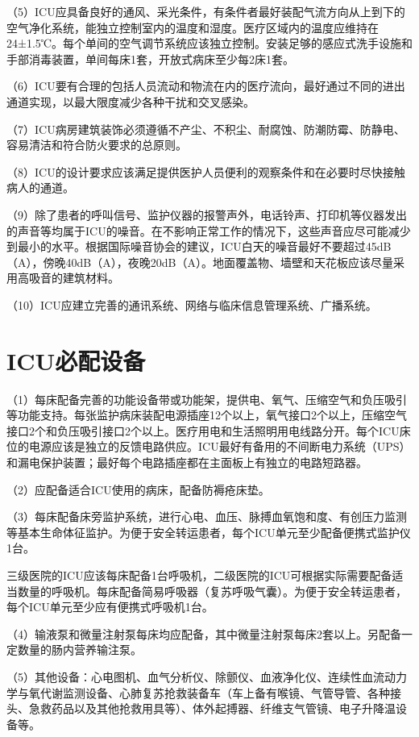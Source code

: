 （5）ICU应具备良好的通风、采光条件，有条件者最好装配气流方向从上到下的空气净化系统，能独立控制室内的温度和湿度。医疗区域内的温度应维持在24±1.5℃。每个单间的空气调节系统应该独立控制。安装足够的感应式洗手设施和手部消毒装置，单间每床1套，开放式病床至少每2床1套。

（6）ICU要有合理的包括人员流动和物流在内的医疗流向，最好通过不同的进出通道实现，以最大限度减少各种干扰和交叉感染。

（7）ICU病房建筑装饰必须遵循不产尘、不积尘、耐腐蚀、防潮防霉、防静电、容易清洁和符合防火要求的总原则。

（8）ICU的设计要求应该满足提供医护人员便利的观察条件和在必要时尽快接触病人的通道。

（9）除了患者的呼叫信号、监护仪器的报警声外，电话铃声、打印机等仪器发出的声音等均属于ICU的噪音。在不影响正常工作的情况下，这些声音应尽可能减少到最小的水平。根据国际噪音协会的建议，ICU白天的噪音最好不要超过45dB（A），傍晚40dB（A），夜晚20dB（A）。地面覆盖物、墙壁和天花板应该尽量采用高吸音的建筑材料。

（10）ICU应建立完善的通讯系统、网络与临床信息管理系统、广播系统。

\section{ICU必配设备}

（1）每床配备完善的功能设备带或功能架，提供电、氧气、压缩空气和负压吸引等功能支持。每张监护病床装配电源插座12个以上，氧气接口2个以上，压缩空气接口2个和负压吸引接口2个以上。医疗用电和生活照明用电线路分开。每个ICU床位的电源应该是独立的反馈电路供应。ICU最好有备用的不间断电力系统（UPS）和漏电保护装置；最好每个电路插座都在主面板上有独立的电路短路器。

（2）应配备适合ICU使用的病床，配备防褥疮床垫。

（3）每床配备床旁监护系统，进行心电、血压、脉搏血氧饱和度、有创压力监测等基本生命体征监护。为便于安全转运患者，每个ICU单元至少配备便携式监护仪1台。

三级医院的ICU应该每床配备1台呼吸机，二级医院的ICU可根据实际需要配备适当数量的呼吸机。每床配备简易呼吸器（复苏呼吸气囊）。为便于安全转运患者，每个ICU单元至少应有便携式呼吸机1台。

（4）输液泵和微量注射泵每床均应配备，其中微量注射泵每床2套以上。另配备一定数量的肠内营养输注泵。

（5）其他设备：心电图机、血气分析仪、除颤仪、血液净化仪、连续性血流动力学与氧代谢监测设备、心肺复苏抢救装备车（车上备有喉镜、气管导管、各种接头、急救药品以及其他抢救用具等）、体外起搏器、纤维支气管镜、电子升降温设备等。

